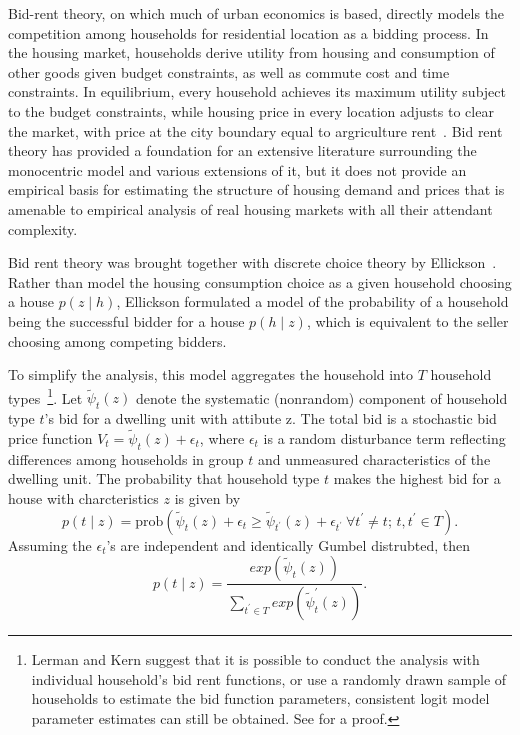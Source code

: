 \documentclass{article}
\begin{document}
Bid-rent theory, on which much of urban economics is based, directly models the
competition among households for residential location as a
bidding process. In the housing market, households derive
utility from housing and consumption of other goods given
budget constraints, as well as commute cost and time
constraints. In equilibrium, every household achieves its
maximum utility subject to the budget constraints, while
housing price in every location adjusts to clear the market,
with price at the city boundary equal to
argriculture rent~\cite{alonso1965}. Bid rent theory has provided
a foundation for an extensive literature surrounding the monocentric
model and various extensions of it, but it does not provide an empirical
basis for estimating the structure of housing demand and prices that is
amenable to empirical analysis of real housing markets with all their
attendant complexity.

Bid rent theory was brought together with discrete choice theory by
Ellickson~\citeyear{ellickson1977b}.  Rather than model the housing consumption choice
as a given household choosing a house $p(z \mid
h)$, Ellickson formulated a model of the probability of a household being the successful
bidder for a house $p(h\mid z)$, which is equivalent to the seller choosing among competing
bidders.

To simplify the analysis, this model aggregates the
household into $T$ household types~\footnote{Lerman and Kern
  suggest that it is possible to conduct the analysis with
  individual household's bid rent functions, or use a
  randomly drawn sample of households to estimate the bid
  function parameters, consistent logit model parameter
  estimates can still be obtained. See
   for a proof.}. Let
$\tilde{\psi}_t(z)$ denote the systematic (nonrandom)
component of household type $t$'s bid for a dwelling unit
with attibute z.  The total bid is a stochastic bid price
function $V_t = \tilde{\psi}_t(z)+\epsilon_t$, where
$\epsilon_t$ is a random disturbance term reflecting
differences among households in group $t$ and unmeasured
characteristics of the dwelling unit. The probability that
household type $t$ makes the highest bid for a house
with charcteristics $z$ is given by
\begin{equation}
\label{eq_p_t1}
p(t \mid z)=\mbox{prob}\left(\tilde{\psi}_t(z)+\epsilon_t \geq \tilde{\psi}_{t^\prime}(z)+\epsilon_{t^\prime} \ \forall{t^\prime} \ne t; \, t, {t^\prime} \in T \right).
\end{equation}
Assuming the $\epsilon_t$'s are independent and identically Gumbel distrubted, then
\begin{equation}
\label{eq_p_t2.rbm}
p(t \mid z)=\frac{exp(\tilde{\psi}_t(z))}{\sum_{t^\prime \in T}{exp(\tilde{\psi}_t^\prime(z))}}.
\end{equation}
\end{document}
